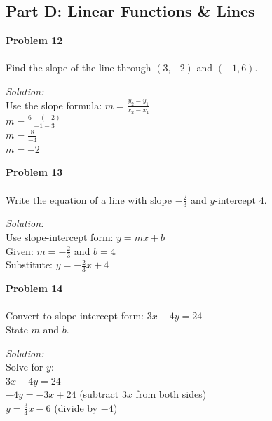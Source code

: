 \documentclass[12pt]{article}
\begin{document}
            \newpage

            \subsection*{Part D: Linear Functions \& Lines}

            \textbf{Problem 12}\\\\
            Find the slope of the line through $(3, -2)$ and $(-1, 6)$.

            \textit{Solution:}\\
            Use the slope formula: $m = \displaystyle\frac{y_2 - y_1}{x_2 - x_1}$\\
            $m = \displaystyle\frac{6 - (-2)}{-1 - 3}$\\
            $m = \displaystyle\frac{8}{-4}$\\
            $m = -2$


            \vspace{0.5cm}

            \textbf{Problem 13}\\\\
            Write the equation of a line with slope $-\displaystyle\frac{2}{3}$ and $y$-intercept 4.

            \textit{Solution:}\\
            Use slope-intercept form: $y = mx + b$\\
            Given: $m = -\displaystyle\frac{2}{3}$ and $b = 4$\\
            Substitute: $y = -\displaystyle\frac{2}{3}x + 4$


            \vspace{0.5cm}

            \textbf{Problem 14}\\\\
            Convert to slope-intercept form: $3x - 4y = 24$\\
            State $m$ and $b$.

            \textit{Solution:}\\
            Solve for $y$:\\
            $3x - 4y = 24$\\
            $-4y = -3x + 24$ \quad (subtract $3x$ from both sides)\\
            $y = \displaystyle\frac{3}{4}x - 6$ \quad (divide by $-4$)
\end{document}
